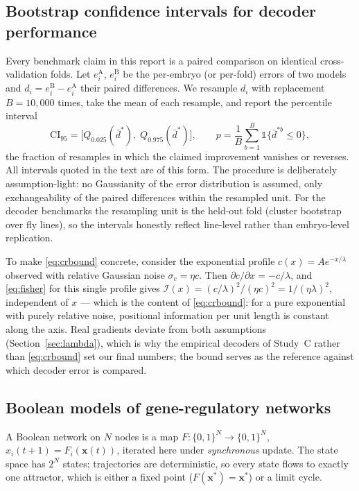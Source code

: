 \subsection{Bootstrap confidence intervals for decoder performance}
\label{sec:math-bootstrap}

Every benchmark claim in this report is a paired comparison on identical
cross-validation folds. Let $e^{\mathrm{A}}_i$, $e^{\mathrm{B}}_i$ be the
per-embryo (or per-fold) errors of two models and
$d_i = e^{\mathrm{B}}_i - e^{\mathrm{A}}_i$ their paired differences. We
resample $d_i$ with replacement $B = 10{,}000$ times, take the mean of each
resample, and report the percentile interval
\begin{equation}
\mathrm{CI}_{95} = \big[ Q_{0.025}(\bar d^{\ast}),\; Q_{0.975}(\bar d^{\ast}) \big],
\qquad
p = \frac{1}{B}\sum_{b=1}^{B} \mathbb{1}\{\bar d^{\ast b} \le 0\},
\label{eq:bootstrap}
\end{equation}
the fraction of resamples in which the claimed improvement vanishes or
reverses. All intervals quoted in the text are of this form. The procedure is
deliberately assumption-light: no Gaussianity of the error distribution is
assumed, only exchangeability of the paired differences within the resampled
unit. For the decoder benchmarks the resampling unit is the held-out fold
(cluster bootstrap over fly lines), so the intervals honestly reflect
line-level rather than embryo-level replication.

To make \eqref{eq:crbound} concrete, consider the exponential profile
$c(x) = A e^{-x/\lambda}$ observed with relative Gaussian noise
$\sigma_c = \eta c$. Then $\partial c/\partial x = -c/\lambda$, and
\eqref{eq:fisher} for this single profile gives
$\mathcal{I}(x) = (c/\lambda)^2 / (\eta c)^2 = 1/(\eta \lambda)^2$,
independent of $x$ --- which is the content of \eqref{eq:crbound}: for a
pure exponential with purely relative noise, positional information per unit
length is constant along the axis. Real gradients deviate from both
assumptions (Section~\ref{sec:lambda}), which is why the empirical decoders
of Study~C rather than \eqref{eq:crbound} set our final numbers; the bound
serves as the reference against which decoder error is compared.

\subsection{Boolean models of gene-regulatory networks}
\label{sec:math-boolean}

A Boolean network on $N$ nodes is a map $F : \{0,1\}^N \to \{0,1\}^N$,
$x_i(t{+}1) = F_i(\mathbf{x}(t))$, iterated here under \emph{synchronous}
update. The state space has $2^N$ states; trajectories are deterministic, so
every state flows to exactly one attractor, which is either a fixed point
($F(\mathbf{x}^\ast) = \mathbf{x}^\ast$) or a limit cycle.

